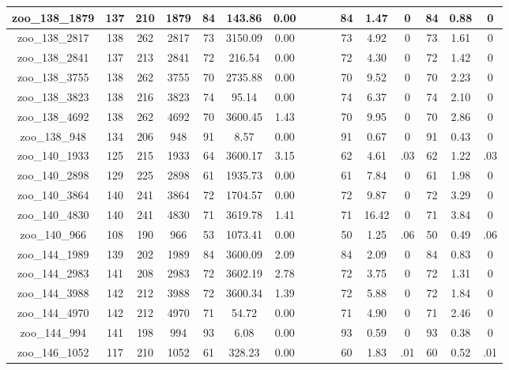 \begin{landscape}
\begin{longtable}{|c|c|c|c|c|c|c|c|c|c|c|c|c|c|c|c|}
zoo\_138\_1879 & 137 & 210 & 1879 & 84 & 143.86 & 0.00 &  &  &  & 84 & 1.47 & 0 & 84 & 0.88 & 0 \\ \hline 
zoo\_138\_2817 & 138 & 262 & 2817 & 73 & 3150.09 & 0.00 &  &  &  & 73 & 4.92 & 0 & 73 & 1.61 & 0 \\ \hline 
zoo\_138\_2841 & 137 & 213 & 2841 & 72 & 216.54 & 0.00 &  &  &  & 72 & 4.30 & 0 & 72 & 1.42 & 0 \\ \hline 
zoo\_138\_3755 & 138 & 262 & 3755 & 70 & 2735.88 & 0.00 &  &  &  & 70 & 9.52 & 0 & 70 & 2.23 & 0 \\ \hline 
zoo\_138\_3823 & 138 & 216 & 3823 & 74 & 95.14 & 0.00 &  &  &  & 74 & 6.37 & 0 & 74 & 2.10 & 0 \\ \hline 
zoo\_138\_4692 & 138 & 262 & 4692 & 70 & 3600.45 & 1.43 &  &  &  & 70 & 9.95 & 0 & 70 & 2.86 & 0 \\ \hline 
zoo\_138\_948 & 134 & 206 & 948 & 91 & 8.57 & 0.00 &  &  &  & 91 & 0.67 & 0 & 91 & 0.43 & 0 \\ \hline 
zoo\_140\_1933 & 125 & 215 & 1933 & 64 & 3600.17 & 3.15 &  &  &  & 62 & 4.61 & .03 & 62 & 1.22 & .03 \\ \hline 
zoo\_140\_2898 & 129 & 225 & 2898 & 61 & 1935.73 & 0.00 &  &  &  & 61 & 7.84 & 0 & 61 & 1.98 & 0 \\ \hline 
zoo\_140\_3864 & 140 & 241 & 3864 & 72 & 1704.57 & 0.00 &  &  &  & 72 & 9.87 & 0 & 72 & 3.29 & 0 \\ \hline 
zoo\_140\_4830 & 140 & 241 & 4830 & 71 & 3619.78 & 1.41 &  &  &  & 71 & 16.42 & 0 & 71 & 3.84 & 0 \\ \hline 
zoo\_140\_966 & 108 & 190 & 966 & 53 & 1073.41 & 0.00 &  &  &  & 50 & 1.25 & .06 & 50 & 0.49 & .06 \\ \hline 
zoo\_144\_1989 & 139 & 202 & 1989 & 84 & 3600.09 & 2.09 &  &  &  & 84 & 2.09 & 0 & 84 & 0.83 & 0 \\ \hline 
zoo\_144\_2983 & 141 & 208 & 2983 & 72 & 3602.19 & 2.78 &  &  &  & 72 & 3.75 & 0 & 72 & 1.31 & 0 \\ \hline 
zoo\_144\_3988 & 142 & 212 & 3988 & 72 & 3600.34 & 1.39 &  &  &  & 72 & 5.88 & 0 & 72 & 1.84 & 0 \\ \hline 
zoo\_144\_4970 & 142 & 212 & 4970 & 71 & 54.72 & 0.00 &  &  &  & 71 & 4.90 & 0 & 71 & 2.46 & 0 \\ \hline 
zoo\_144\_994 & 141 & 198 & 994 & 93 & 6.08 & 0.00 &  &  &  & 93 & 0.59 & 0 & 93 & 0.38 & 0 \\ \hline 
zoo\_146\_1052 & 117 & 210 & 1052 & 61 & 328.23 & 0.00 &  &  &  & 60 & 1.83 & .01 & 60 & 0.52 & .01 \\ \hline 

\end{longtable}
\end{landscape}
